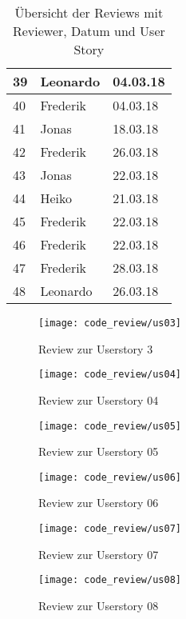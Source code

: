 \begin{table}[h]
\begin{center}
\begin{tabular}{|l|l|l|}
    39 & Leonardo   & 04.03.18 \\\hline
    40 & Frederik   & 04.03.18 \\\hline
    41 & Jonas      & 18.03.18 \\\hline
    42 & Frederik   & 26.03.18 \\\hline
    43 & Jonas      & 22.03.18 \\\hline
    44 & Heiko      & 21.03.18 \\\hline
    45 & Frederik   & 22.03.18 \\\hline
    46 & Frederik   & 22.03.18 \\\hline
    47 & Frederik   & 28.03.18 \\\hline
    48 & Leonardo   & 26.03.18 \\\hline
\end{tabular}
\end{center}
	\caption{Übersicht der Reviews mit Reviewer, Datum und User Story}
	\label{mapping_us_review}
\end{table}

\begin{figure}[H]
\centering
\texttt{[image: code\_review/us03]}
	\caption{Review zur Userstory 3}
\end{figure}

\begin{figure}[H]
\centering
\texttt{[image: code\_review/us04]}
\caption{Review zur Userstory 04}
\end{figure}

\begin{figure}[H]
\centering
\texttt{[image: code\_review/us05]}
\caption{Review zur Userstory 05}
\end{figure}

\begin{figure}[H]
\centering
\texttt{[image: code\_review/us06]}
\caption{Review zur Userstory 06}
\end{figure}

\begin{figure}[H]
\centering
\texttt{[image: code\_review/us07]}
\caption{Review zur Userstory 07}
\end{figure}

\begin{figure}[H]
\centering
\texttt{[image: code\_review/us08]}
\caption{Review zur Userstory 08}
\end{figure}

